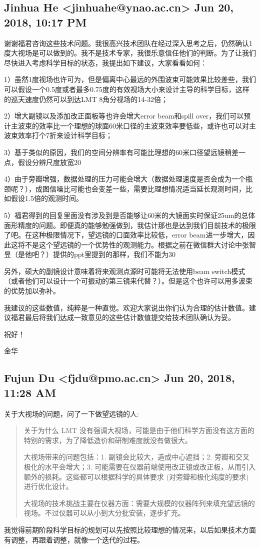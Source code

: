 \documentclass{article}
\newcommand\from[2]{\subsection{{#1} {#2}}}
\newcommand\said[1]{#1}
\begin{document}
\from{
Jinhua He <jinhuahe@ynao.ac.cn>
}{
Jun 20, 2018, 10:17 PM
}
\said{
谢谢福君咨询这些技术问题。我很高兴技术团队在经过深入思考之后，仍然确认1度大视场是可以做到的。我不是技术专家，我很乐意信任他们的判断。为了让我们尽快进入考虑科学目标的状态，我提出如下建议，大家看看如何：

1）虽然1度视场也许可为，但是偏离中心最远的外围波束可能效果比较差些，我们可以假设一个0.5度或者最多0.75度的有效视场大小来设计主导的科学目标，这样的巡天速度仍然可以到达LMT 8角分视场的14-32倍；

2）增大副镜以及添加改正面板等也许会增大error beam和spill over，我们可以预计主波束的效率比一个理想的球面60米口径的主波束效率要低些，或许也可以对主波束效率打个7折来设计科学目标；

3）基于类似的原因，我们的空间分辨率有可能比理想的60米口径望远镜稍差一点，假设分辨尺度放宽20%

4）由于旁瓣增强，数据处理的压力可能会增大（数据处理速度是否会成为一个瓶颈呢？），成图信噪比可能也会变差一些，需要比理想情况适当延长观测时间，比如假设1.5倍的观测时间。

5）福君得到的回复里面没有涉及到是否能够让60米的大镜面实时保证25um的总体面形精度的问题。即便真的能够勉强做到，我估计那也是达到我们目前技术的极限了吧。在这种极限情况下，望远镜的口面效率比较低，error beam进一步增大，因此这将不是这个望远镜的一个优势性的观测能力。根据之前在微信群大讨论中张智昱（是他吧？）提供的ppt里提到的那样，我们不能为30%

另外，硕大的副镜设计意味着将来观测点源时可能将无法使用beam switch模式（或者他们可以设计一个可振动的第三镜来代替？）。但是这个也许可以用多波束的优势加以弥补。

我建议的这些数值，纯粹是一种直觉。欢迎大家说出你们认为合理的估计数值。建议福君最后将我们达成一致意见的这些估计数值提交给技术团队确认为妥。

祝好！

金华
}


\from{
Fujun Du <fjdu@pmo.ac.cn>
}{
Jun 20, 2018, 11:28 AM
}
\said{
关于大视场的问题，问了一下做望远镜的人:

\begin{quotation}
关于为什么 LMT 没有强调大视场，可能是由于他们科学方面没有这方面的特别的需求，为了降低造价和研制难度就没有做很大。

大视场带来的问题包括：1. 副镜会比较大，造成中心遮挡；2.  旁瓣和交叉极化的水平会增大；3. 可能需要在仪器前端使用改正镜或改正板，从而引入额外的损耗。这些都可以根据科学的具体要求 (对旁瓣和极化纯度的要求) 进行优化设计。

大视场的技术挑战主要在仪器方面：需要大规模的仪器阵列来填充望远镜的视场。不过仪器可以从小到大分批安装，逐步扩充。
\end{quotation}

我觉得前期阶段科学目标的规划可以先按照比较理想的情况来，以后如果技术方面有调整，再跟着调整，就像一个迭代的过程。

}
\end{document}
